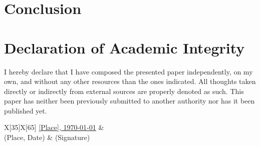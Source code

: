 \documentclass[10pt, twoside, a4paper, titlepage]{thesis}
\begin{document}
	\section{Conclusion\label{sec:conclusion}}
	

	\backmatter
	\printbibliography
	\listoffigures
	\listoftables

	\section{Declaration of Academic Integrity}
	I hereby declare that I have composed the presented paper independently, on my own, and without any other resources
	than the ones indicated. All thoughts taken directly or indirectly from external sources are properly denoted as
	such. This paper has neither been previously submitted to another authority nor has it been published yet.
	\vspace{4em}
	\begin{center}
		\begin{tblr}{X[35]X[65]}
			\uline{[Place], \today\hfill} & \uline{\hfill\null}\\
			(Place, Date) & (Signature)
		\end{tblr}
	\end{center}
\end{document}
